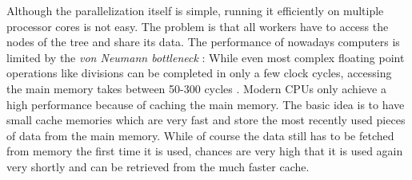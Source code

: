 Although the parallelization itself is simple, running it efficiently on multiple processor cores is not easy. The problem is that all workers have to access the nodes of the tree and share its data. The performance of nowadays computers is limited by the \emph{von Neumann bottleneck} \citep{bryant2010computer}: While even most complex floating point operations like divisions can be completed in only a few clock cycles, accessing the main memory takes between 50-300 cycles \citep{2008WhitepaperFry}. Modern CPUs only achieve a high performance because of caching the main memory. The basic idea is to have small cache memories which are very fast and store the most recently used pieces of data from the main memory. While of course the data still has to be fetched from memory the first time it is used, chances are very high that it is used again very shortly and can be retrieved from the much faster cache. 

